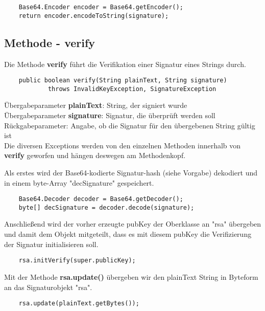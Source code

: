 \documentclass[12pt]{article}
\begin{document}
\begin{lstlisting}
    Base64.Encoder encoder = Base64.getEncoder();
    return encoder.encodeToString(signature);
\end{lstlisting}

\newpage

\subsection{Methode - verify}

Die Methode \textbf{verify} führt die Verifikation einer Signatur eines Strings durch.

\begin{lstlisting}
    public boolean verify(String plainText, String signature)
            throws InvalidKeyException, SignatureException
\end{lstlisting}

Übergabeparameter \textbf{plainText}: String, der signiert wurde\\
Übergabeparameter \textbf{signature}: Signatur, die überprüft werden soll
Rückgabeparameter: Angabe, ob die Signatur für den übergebenen String gültig ist\\

Die diversen Exceptions werden von den einzelnen Methoden innerhalb von \textbf{verify} geworfen und hängen deswegen am Methodenkopf.

Als erstes wird der Base64-kodierte Signatur-hash (siehe Vorgabe) dekodiert und in einem byte-Array "decSignature" gespeichert.

\begin{lstlisting}
    Base64.Decoder decoder = Base64.getDecoder();
    byte[] decSignature = decoder.decode(signature);
\end{lstlisting}

Anschließend wird der vorher erzeugte pubKey der Oberklasse an "rsa" übergeben und damit dem Objekt mitgeteilt, dass es mit diesem pubKey die Verifizierung der Signatur initialisieren soll.

\begin{lstlisting}
    rsa.initVerify(super.publicKey);
\end{lstlisting}

Mit der Methode \textbf{rsa.update()} übergeben wir den plainText String in Byteform an das Signaturobjekt "rsa".

\begin{lstlisting}
    rsa.update(plainText.getBytes());
\end{lstlisting}
\end{document}
